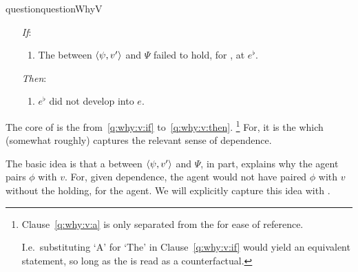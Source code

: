 \begin{note}
\begin{restatable}[\qWhyV{}]{question}{questionWhyV}
\begin{itemize}
      \begin{enumerate}
      \item[\emph{If}:]
        \begin{enumerate}[label=\alph*., ref=(\alph*), resume*=qWhyVdef]
        \item
          \label{q:why:v:if}
          The  between \(\langle \psi, v' \rangle\) and \(\Psi\) failed to hold, for \vAgent{}, at \(e^{\flat}\).
        \end{enumerate}
      \item[\emph{Then}:]
        \begin{enumerate}[label=\alph*., ref=(\alph*), resume*=qWhyVdef]
        \item
          \label{q:why:v:then}
          \(e^{\flat}\) did not develop into \(e\).
        \end{enumerate}
      \end{enumerate}
    \end{itemize}
    \vspace{-\baselineskip}
  \end{restatable}

  The core of \qWhyV{} is the \qWVitc{} from~\ref{q:why:v:if} to~\ref{q:why:v:then}.%
  \footnote{
    Clause~\ref{q:why:v:a} is only separated from the \qWVitc{} for ease of reference.

    I.e.\ substituting `A' for `The' in Clause~\ref{q:why:v:if} would yield an equivalent statement, so long as the \qWVitc{} is read as a counterfactual.
  }
  For, it is the \qWVitc{} which (somewhat roughly) captures the relevant sense of dependence.
\end{note}

\begin{note}
    The basic idea is that a \ros{} between \(\langle \psi, v' \rangle\) and \(\Psi\), in part, explains why the agent pairs \(\phi\) with \(v\).
  For, given dependence, the agent would not have paired \(\phi\) with \(v\) without the \ros{} holding, for the agent.
  We will explicitly capture this idea with \linkW{}.
\end{note}

